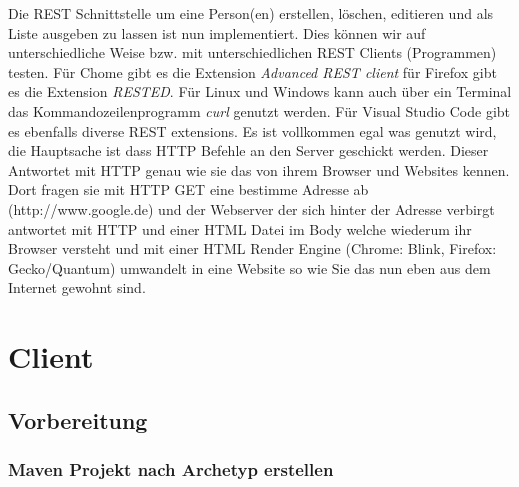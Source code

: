 \documentclass[11pt]{scrartcl}
\begin{document}
Die REST Schnittstelle um eine Person(en) erstellen, löschen, editieren und als Liste
ausgeben zu lassen ist nun implementiert.\newline
Dies können wir auf unterschiedliche Weise bzw. mit unterschiedlichen REST Clients (Programmen)
testen. Für Chome gibt es die Extension \textit{Advanced REST client} für Firefox
gibt es die Extension \textit{RESTED}. Für Linux und Windows kann auch über ein Terminal
das Kommandozeilenprogramm \textit{curl} genutzt werden. Für Visual Studio Code gibt es
ebenfalls diverse REST extensions. Es ist vollkommen egal was genutzt wird, die Hauptsache
ist dass HTTP Befehle an den Server geschickt werden. Dieser Antwortet mit HTTP
genau wie sie das von ihrem Browser und Websites kennen. Dort fragen sie mit HTTP GET 
eine bestimme Adresse ab (http://www.google.de) und der Webserver der sich hinter der Adresse
verbirgt antwortet mit HTTP und einer HTML Datei im Body welche wiederum ihr Browser
versteht und mit einer HTML Render Engine (Chrome: Blink, Firefox: Gecko/Quantum) umwandelt
in eine Website so wie Sie das nun eben aus dem Internet gewohnt sind.

\newpage
\section{Client}
\label{sec:client}

\subsection{Vorbereitung}
\label{sec:clientsetup}

\subsubsection{Maven Projekt nach Archetyp erstellen}
\label{sec:clientmaven}
\end{document}
